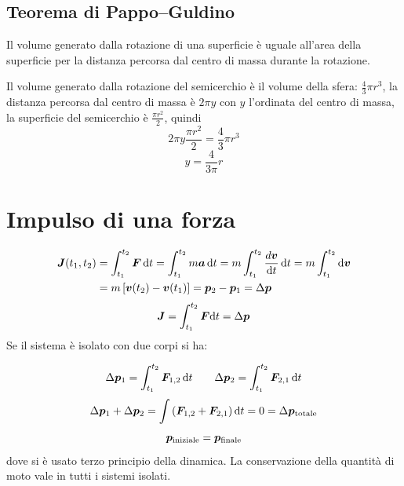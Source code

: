 \subsection{Teorema di Pappo--Guldino}
\begin{Teo}
Il volume generato dalla rotazione di una superficie è uguale
all'area della superficie per la distanza percorsa dal centro di
massa durante la rotazione.
\end{Teo}
\begin{Es}[Semicerchio]
Il volume generato dalla rotazione del semicerchio è il volume della
sfera: $\frac{4}{3}\pi r^3$, la distanza percorsa dal centro di
massa è $2\pi y$ con $y$ l'ordinata del centro di massa, la
superficie del semicerchio è $\frac{\pi r^2}{2}$, quindi
\begin{equation*}2\pi y\frac{\pi r^2}{2}=\frac{4}{3}\pi r^3\end{equation*}
\begin{equation*}y=\frac{4}{3\pi}r\end{equation*}
\end{Es}

\section{Impulso di una forza}
\begin{align*}
\boldsymbol{J}(t_1,t_2)&=\int_{t_1}^{t_2} \boldsymbol{F}\, \mathrm{d} t=\int_{t_1}^{t_2}m\boldsymbol{a}\, \mathrm{d} t=m\int_{t_1}^{t_2}\frac{d\boldsymbol{v}}{\mathrm{d} t}\,\mathrm{d} t=m\int_{t_1}^{t_2}\mathrm{d} \boldsymbol{v}\\
&=m\left[\boldsymbol{v}(t_2)-\boldsymbol{v}(t_1)\right]=\boldsymbol{p}_2 - \boldsymbol{p}_1=\Delta \boldsymbol{p}
\end{align*}
\begin{equation*}
\boldsymbol{J}=\int_{t_1}^{t_2}\boldsymbol{F} \mathrm{d} t=\Delta \boldsymbol{p}
\end{equation*}
Se il sistema è isolato con due corpi si ha:

\begin{equation*}
\Delta \boldsymbol{p}_1=\int_{t_1}^{t_2} \boldsymbol{F}_{1,2}\, \mathrm{d} t\qquad \Delta \boldsymbol{p}_2=\int_{t_1}^{t_2} \boldsymbol{F}_{2,1}\, \mathrm{d} t
\end{equation*}
\begin{equation*}
\Delta \boldsymbol{p}_1 + \Delta \boldsymbol{p}_2=\int\left(\boldsymbol{F}_{1,2}+\boldsymbol{F}_{2,1}\right)\mathrm{d} t=0=\Delta\boldsymbol{p}_{\text{totale}}
\end{equation*}
\begin{equation*}
\boldsymbol{p}_{\text{iniziale}}=\boldsymbol{p}_{\text{finale}}
\end{equation*}
dove si è usato terzo principio della dinamica. La conservazione della quantità di moto vale in tutti i sistemi isolati.

